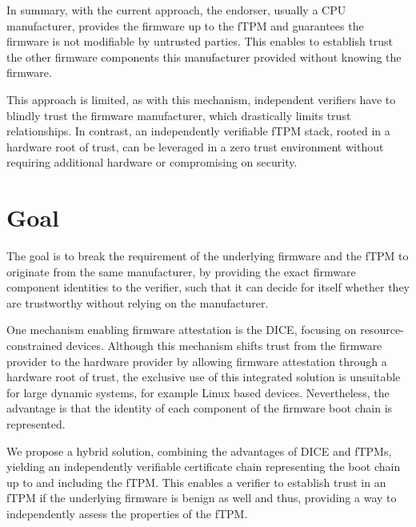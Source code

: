 In summary, with the current approach, the endorser, usually a CPU manufacturer, provides the firmware up to the fTPM and guarantees the firmware is not modifiable by untrusted parties. This enables to establish trust the other firmware components this manufacturer provided without knowing the firmware.


This approach is limited, as with this mechanism, independent verifiers have to blindly trust the firmware manufacturer, which drastically limits trust relationships.
In contrast, an independently verifiable fTPM stack, rooted in a hardware root of trust, can be leveraged in a zero trust environment without requiring additional hardware or compromising on security.

\section{Goal}

The goal is to break the requirement of the underlying firmware and the fTPM to originate from the same manufacturer, by providing the exact firmware component identities to the verifier, such that it can decide for itself whether they are trustworthy without relying on the manufacturer.


One mechanism enabling firmware attestation is the \ac{DICE}, focusing on resource-constrained devices. Although this mechanism shifts trust from the firmware provider to the hardware provider by allowing firmware attestation through a hardware root of trust, the exclusive use of this integrated solution is unsuitable for large dynamic systems, for example Linux based devices.
Nevertheless, the advantage is that the identity of each component of the firmware boot chain is represented.


We propose a hybrid solution, combining the advantages of \ac{DICE} and \acp{fTPM}, yielding an independently verifiable certificate chain representing the boot chain up to and including the \ac{fTPM}.
This enables a verifier to establish trust in an \ac{fTPM} if the underlying firmware is benign as well and thus, providing a way to independently assess the properties of the \ac{fTPM}.

